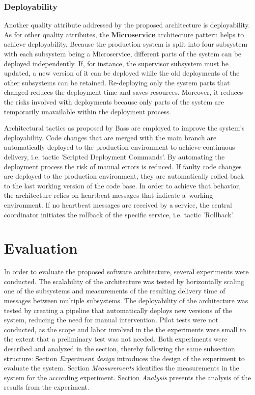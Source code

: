 \documentclass[conference]{IEEEtran}
\begin{document}
\subsubsection{Deployability}
Another quality attribute addressed by the proposed architecture is deployability. As for other quality attributes, the \textbf{Microservice} architecture pattern helps to achieve deployability. Because the production system is split into four subsystem with each subsystem being a Microservice, different parts of the system can be deployed independently. If, for instance, the supervisor subsystem must be updated, a new version of it can be deployed while the old deployments of the other subsystems can be retained. Re-deploying only the system parts that changed reduces the deployment time and saves resources. Moreover, it reduces the risks involved with deployments because only parts of the system are temporarily unavailable within the deployment process.

Architectural tactics as proposed by Bass \cite{bass2012software} are employed to improve the system's deployability. Code changes that are merged with the main branch are automatically deployed to the production environment to achieve continuous delivery, i.e. tactic 'Scripted Deployment Commands'. By automating the deployment process the risk of manual errors is reduced. If faulty code changes are deployed to the production environment, they are automatically rolled back to the last working version of the code base. In order to achieve that behavior, the architecture relies on heartbeat messages that indicate a~working environment. If no heartbeat messages are received by a service, the central coordinator initiates the rollback of the specific service, i.e. tactic 'Rollback'.


\section{Evaluation}
\label{sec:evaluation}
In order to evaluate the proposed software architecture, several experiments were conducted. The scalability of the architecture was tested by horizontally scaling one of the subsystems and measurements of the resulting delivery time of messages between multiple subsystems. The deployability of the architecture was tested by creating a pipeline that automatically deploys new versions of the system, reducing the need for manual intervention. Pilot tests were not conducted, as the scope and labor involved in the the experiments were small to the extent that a preliminary test was not needed.
Both experiments were described and analyzed in the section, thereby following the same subsection structure: Section \textit{Experiment design} introduces the design of the experiment to evaluate the system. Section \textit{Measurements} identifies the measurements in the system for the according experiment. Section \textit{Analysis} presents the analysis of the results from the experiment.
\end{document}
